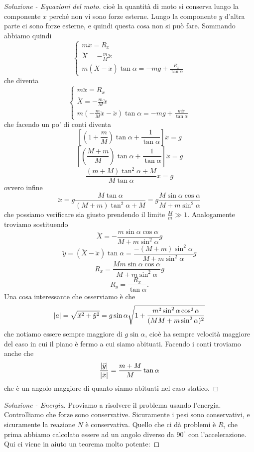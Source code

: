 \documentclass[11pt]{scrartcl}
\begin{document}
\begin{sol}
\begin{proof}[Soluzione - Equazioni del moto]
			cioè la quantità di moto si conserva lungo la componente $x$ perché non vi sono forze esterne. Lungo la componente $y$ d'altra parte ci sono forze esterne, e quindi questa cosa non si può fare. 
			Sommando abbiamo quindi
			$$\begin{cases}
				m\ddot{x}=R_x \\
				\ddot{X}=-\frac{m}{M}\ddot{x} \\
				m(\ddot{X}-\ddot{x})\tan\alpha=-mg+\frac{R_x}{\tan\alpha}
			\end{cases}$$
			che diventa
			$$\begin{cases}
				m\ddot{x}=R_x \\
				\ddot{X}=-\frac{m}{M}\ddot{x} \\
				m(-\frac{m}{M}\ddot{x}-\ddot{x})\tan\alpha=-mg+\frac{m\ddot{x}}{\tan\alpha}
			\end{cases}$$
			che facendo un po' di conti diventa
			$$\left[\left(1+\frac{m}{M}\right)\tan\alpha+\frac{1}{\tan\alpha}\right]\ddot{x}=g$$
			$$\left[\left(\frac{M+m}{M}\right)\tan\alpha+\frac{1}{\tan\alpha}\right]\ddot{x}=g$$
			$$\frac{(m+M)\tan^2\alpha +M}{M\tan \alpha}\ddot{x}=g$$
			ovvero infine
			$$\ddot{x}=g\frac{M\tan \alpha}{(M+m)\tan^2\alpha+M}=g\frac{M\sin\alpha \cos\alpha}{M+m\sin^2\alpha}$$
			che possiamo verificare sia giusto prendendo il limite $\frac{M}{m}\gg 1$. Analogamente troviamo sostituendo
			$$\ddot{X}=-\frac{m\sin\alpha\cos\alpha}{M+m\sin^2\alpha}g$$
			$$\ddot{y}=\left(\ddot{X}-\ddot{x}\right)\tan\alpha=\frac{-(M+m)\sin^2\alpha}{M+m\sin^2\alpha}g$$
			$$R_x=\frac{Mm\sin\alpha\cos\alpha}{M+m\sin^2\alpha}g$$
			$$R_y=\frac{R_x}{\tan\alpha}.$$
			Una cosa interessante che osserviamo è che 
			$$\left\lvert a \right\rvert=\sqrt{\ddot{x}^2+\ddot{y}^2}=g\sin\alpha\sqrt{1+\frac{m^2\sin^2\alpha\cos^2\alpha}{(MM+m\sin^2\alpha)^2}}$$
			che notiamo essere sempre maggiore di $g\sin\alpha$, cioè ha sempre velocità maggiore del caso in cui il piano è fermo a cui siamo abituati. Facendo i conti troviamo anche che
			$$\frac{\left\lvert \ddot{y} \right\rvert}{\left\lvert \ddot{x} \right\rvert}=\frac{m+M}{M}\tan\alpha$$
			che è un angolo maggiore di quanto siamo abituati nel caso statico.
		\end{proof}
		\begin{proof}[Soluzione - Energia]
			Proviamo a risolvere il problema usando l'energia. Controlliamo che forze sono conservative. Sicuramente i pesi sono conservativi, e sicuramente la reazione $N$ è conservativa. Quello che ci dà problemi è $R$, che prima abbiamo calcolato essere ad un angolo diverso da $90^\circ$ con l'accelerazione. Qui ci viene in aiuto un teorema molto potente:

\end{proof}
\end{sol}
\end{document}
